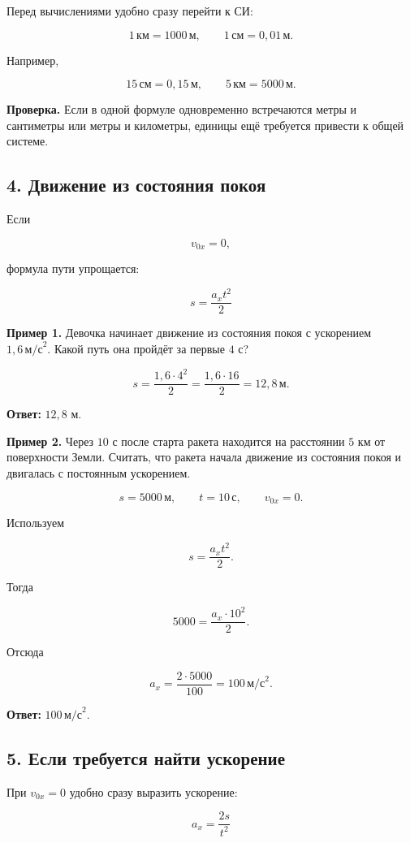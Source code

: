 \documentclass[a4paper,12pt]{article}
\newcommand{\mss}{\,\text{м/с}^2}
\newcommand{\important}[1]{\textcolor{darkaccent}{\textbf{#1}}}
\newcommand{\formula}[1]{\[\boxed{#1}\]}
\begin{document}
Перед вычислениями удобно сразу перейти к СИ:

\[
1\,\text{км}=1000\,\text{м},
\qquad
1\,\text{см}=0{,}01\,\text{м}.
\]

Например,

\[
15\,\text{см}=0{,}15\,\text{м},
\qquad
5\,\text{км}=5000\,\text{м}.
\]

\important{Проверка.}
Если в одной формуле одновременно встречаются метры и сантиметры
или метры и километры, единицы ещё требуется привести к общей системе.

\subsection*{4. Движение из состояния покоя}

Если

\[
v_{0x}=0,
\]

формула пути упрощается:

\formula{s=\frac{a_xt^2}{2}}

\textbf{Пример 1.}
Девочка начинает движение из состояния покоя
с ускорением $1{,}6\mss$.
Какой путь она пройдёт за первые $4$ с?

\[
s=
\frac{1{,}6\cdot 4^2}{2}
=
\frac{1{,}6\cdot16}{2}
=
12{,}8\,\text{м}.
\]

\textbf{Ответ:}
$12{,}8$ м.

\medskip

\textbf{Пример 2.}
Через $10$ с после старта ракета находится на расстоянии
$5$ км от поверхности Земли.
Считать, что ракета начала движение из состояния покоя
и двигалась с постоянным ускорением.

\[
s=5000\,\text{м},
\qquad
t=10\,\text{с},
\qquad
v_{0x}=0.
\]

Используем

\[
s=\frac{a_xt^2}{2}.
\]

Тогда

\[
5000=\frac{a_x\cdot10^2}{2}.
\]

Отсюда

\[
a_x=
\frac{2\cdot5000}{100}
=
100\mss.
\]

\textbf{Ответ:}
$100\mss$.

\subsection*{5. Если требуется найти ускорение}

При $v_{0x}=0$ удобно сразу выразить ускорение:

\formula{a_x=\frac{2s}{t^2}}
\end{document}

